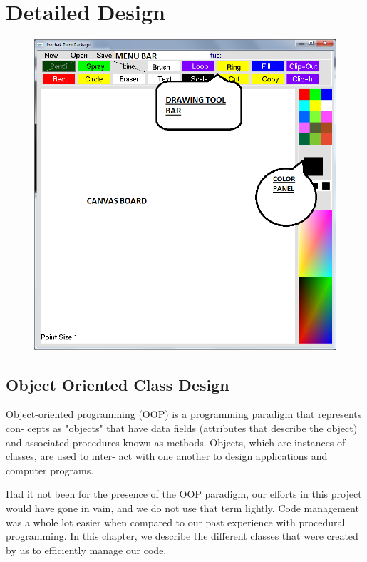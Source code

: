 \documentclass[12pt]{report}
\begin{document}
\chapter{Detailed Design}

\begin{figure}[h!]
	\centering
		\includegraphics[scale=0.6]{./screenshots/screen_labeling.png}
\end{figure}



\section{Object Oriented Class Design}

Object-oriented programming (OOP) is a programming paradigm that represents con-
cepts as "objects" that have data fields (attributes that describe the object) and associated
procedures known as methods. Objects, which are instances of classes, are used to inter-
act with one another to design applications and computer programs.

Had it not been for the presence of the OOP paradigm, our efforts in this project would
have gone in vain, and we do not use that term lightly. Code management was a whole
lot easier when compared to our past experience with procedural programming. In this
chapter, we describe the different classes that were created by us to efficiently manage
our code.
\end{document}

